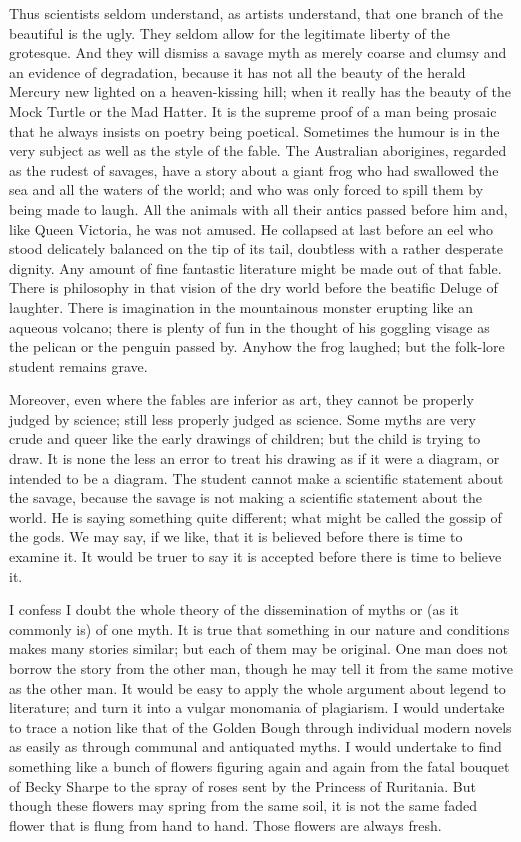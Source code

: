 Thus scientists seldom understand, as artists understand, that one branch of the beautiful is the ugly. They seldom allow for the legitimate liberty of the grotesque. And they will dismiss a savage myth as merely coarse and clumsy and an evidence of degradation, because it has not all the beauty of the herald Mercury new lighted on a heaven-kissing hill; when it really has the beauty of the Mock Turtle or the Mad Hatter. It is the supreme proof of a man being prosaic that he always insists on poetry being poetical. Sometimes the humour is in the very subject as well as the style of the fable. The Australian aborigines, regarded as the rudest of savages, have a story about a giant frog who had swallowed the sea and all the waters of the world; and who was only forced to spill them by being made to laugh. All the animals with all their antics passed before him and, like Queen Victoria, he was not amused. He collapsed at last before an eel who stood delicately balanced on the tip of its tail, doubtless with a rather desperate dignity. Any amount of fine fantastic literature might be made out of that fable. There is philosophy in that vision of the dry world before the beatific Deluge of laughter. There is imagination in the mountainous monster erupting like an aqueous volcano; there is plenty of fun in the thought of his goggling visage as the pelican or the penguin passed by. Anyhow the frog laughed; but the folk-lore student remains grave.

Moreover, even where the fables are inferior as art, they cannot be properly judged by science; still less properly judged as science. Some myths are very crude and queer like the early drawings of children; but the child is trying to draw. It is none the less an error to treat his drawing as if it were a diagram, or intended to be a diagram. The student cannot make a scientific statement about the savage, because the savage is not making a scientific statement about the world. He is saying something quite different; what might be called the gossip of the gods. We may say, if we like, that it is believed before there is time to examine it. It would be truer to say it is accepted before there is time to believe it.

I confess I doubt the whole theory of the dissemination of myths or (as it commonly is) of one myth. It is true that something in our nature and conditions makes many stories similar; but each of them may be original. One man does not borrow the story from the other man, though he may tell it from the same motive as the other man. It would be easy to apply the whole argument about legend to literature; and turn it into a vulgar monomania of plagiarism. I would undertake to trace a notion like that of the Golden Bough through individual modern novels as easily as through communal and antiquated myths. I would undertake to find something like a bunch of flowers figuring again and again from the fatal bouquet of Becky Sharpe to the spray of roses sent by the Princess of Ruritania. But though these flowers may spring from the same soil, it is not the same faded flower that is flung from hand to hand. Those flowers are always fresh.

